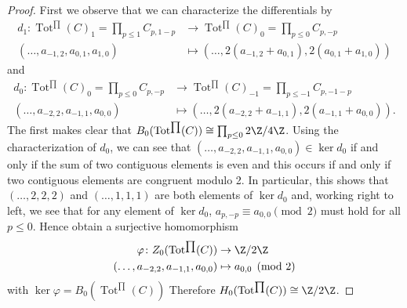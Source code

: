 \documentclass[10pt]{amsart}
\begin{document}
\begin{ex}
  \begin{proof}
    First we observe that we can characterize the differentials by
    \begin{align*}
      d_1 \colon \operatorname{Tot}^{\prod}(C)_1 = \prod_{p \leq 1} C_{p,1-p} &\rightarrow \operatorname{Tot}^{\prod}(C)_0 = \prod_{p \leq 0} C_{p,-p}\\
      (\ldots, a_{-1, 2}, a_{0, 1}, a_{1, 0}) &\mapsto (\ldots, 2(a_{-1,2} + a_{0,1}), 2(a_{0,1} + a_{1,0}))
    \end{align*}
    and
    \begin{align*}
      d_0 \colon \operatorname{Tot}^{\prod}(C)_0 = \prod_{p \leq 0} C_{p,-p} &\rightarrow \operatorname{Tot}^{\prod}(C)_{-1} = \prod_{p \leq -1} C_{p,- 1 - p}\\
      (\ldots, a_{-2, 2}, a_{-1, 1}, a_{0, 0}) &\mapsto (\ldots, 2(a_{-2,2} + a_{-1,1}), 2(a_{-1,1} + a_{0,0})).
    \end{align*}
    The first makes clear that $B_0(\operatorname{Tot}^{\prod}(C)) \cong \prod_{p \leq 0} 2\Z/4\Z$.
    Using the characterization of $d_0$, we can see that $(\ldots, a_{-2, 2}, a_{-1, 1}, a_{0, 0}) \in \ker d_0$ if and only if the sum of two contiguous elements is even and this occurs if and only if two contiguous elements are congruent modulo 2.
    In particular, this shows that $(\ldots, 2, 2, 2)$ and $(\ldots, 1, 1, 1)$ are both elements of $\ker d_0$ and, working right to left, we see that for any element of $\ker d_0$, $a_{p,-p} \equiv a_{0,0} \pmod{2}$ must hold for all $p \leq 0$.
    Hence obtain a surjective homomorphism
    \begin{align*}
      \varphi \colon Z_0(\operatorname{Tot}^{\prod}(C)) &\rightarrow \Z/2\Z\\
      (\ldots, a_{-2, 2}, a_{-1, 1}, a_{0, 0}) &\mapsto a_{0,0} \pmod{2}
    \end{align*}
    with $\ker\varphi = B_0(\operatorname{Tot}^{\prod}(C))$
    Therefore $H_0(\operatorname{Tot}^{\prod}(C)) \cong \Z/2\Z$.
  \end{proof}
\end{ex}
\end{document}
